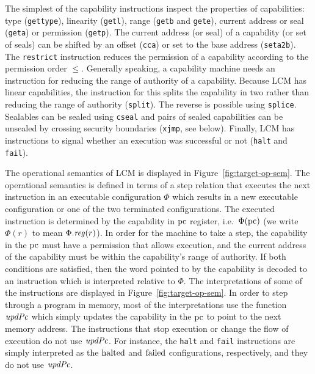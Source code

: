 \documentclass[acmsmall,review,showframe]{acmart}\settopmatter{printfolios=true,printccs=false,printacmref=false}
\renewcommand{\updPcAddr}[1]{\plainfun{updPc}{#1}}
\newcommand{\trgcm}{\textsc{LCM}}
\begin{document}
The simplest of the capability instructions inspect the properties of capabilities: type (\texttt{gettype}), linearity (\texttt{getl}), range (\texttt{getb} and \texttt{gete}), current address or seal (\texttt{geta}) or permission (\texttt{getp}).
The current address (or seal) of a capability (or set of seals) can be shifted by an offset (\texttt{cca}) or set to the base address (\texttt{seta2b}).
The \texttt{restrict} instruction reduces the permission of a capability according to the permission order $\le$.
Generally speaking, a capability machine needs an instruction for reducing the range of authority of a capability.
Because \trgcm{} has linear capabilities, the instruction for this splits the capability in two rather than reducing the range of authority (\texttt{split}).
The reverse is possible using \texttt{splice}.
Sealables can be sealed using \texttt{cseal} and pairs of sealed capabilities can be unsealed by crossing security boundaries (\texttt{xjmp}, see below).
Finally, \trgcm{} has instructions to signal whether an execution was successful or not (\texttt{halt} and \texttt{fail}).

The operational semantics of \trgcm{} is displayed in Figure~\ref{fig:target-op-sem}.
The operational semantics is defined in terms of a step relation that executes the next instruction in an executable configuration $\Phi$ which results in a new executable configuration or one of the two terminated configurations.
The executed instruction is determined by the capability in $\mathrm{pc}$ register, i.e.\ $\Phi(\mathrm{pc})$ (we write $\Phi(r)$ to mean $\Phi.\reg(r)$).
In order for the machine to take a step, the capability in the $\mathrm{pc}$ must have a permission that allows execution, and the current address of the capability must be within the capability's range of authority.
If both conditions are satisfied, then the word pointed to by the capability is decoded to an instruction which is interpreted relative to $\Phi$.
The interpretations of some of the instructions are displayed in Figure~\ref{fig:target-op-sem}.
In order to step through a program in memory, most of the interpretations use the function $\updPcAddr{}$ which simply updates the capability in the $\mathrm{pc}$ to point to the next memory address.
The instructions that stop execution or change the flow of execution do not use $\updPcAddr{}$.
For instance, the \texttt{halt} and \texttt{fail} instructions are simply interpreted as the $\mathrm{halted}$ and $\mathrm{failed}$ configurations, respectively, and they do not use $\updPcAddr{}$.
\end{document}
